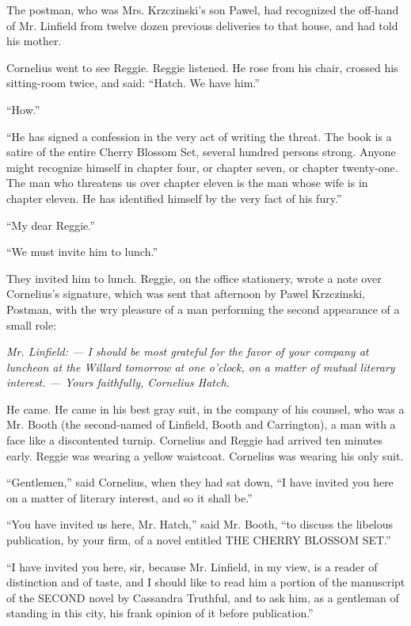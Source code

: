 \documentclass[12pt,openright]{book}
\begin{document}
The postman, who was Mrs. Krzczinski’s son Pawel, had recognized the off-hand of Mr. Linfield from twelve dozen previous deliveries to that house, and had told his mother.

Cornelius went to see Reggie. Reggie listened. He rose from his chair, crossed his sitting-room twice, and said: “Hatch. We have him.”

“How.”

“He has signed a confession in the very act of writing the threat. The book is a satire of the entire Cherry Blossom Set, several hundred persons strong. Anyone might recognize himself in chapter four, or chapter seven, or chapter twenty-one. The man who threatens us over chapter eleven is the man whose wife is in chapter eleven. He has identified himself by the very fact of his fury.”

“My dear Reggie.”

“We must invite him to lunch.”

They invited him to lunch. Reggie, on the office stationery, wrote a note over Cornelius’s signature, which was sent that afternoon by Pawel Krzczinski, Postman, with the wry pleasure of a man performing the second appearance of a small role:

\textit{Mr. Linfield: — I should be most grateful for the favor of your company at luncheon at the Willard tomorrow at one o’clock, on a matter of mutual literary interest. — Yours faithfully, Cornelius Hatch.}

He came. He came in his best gray suit, in the company of his counsel, who was a Mr. Booth (the second-named of Linfield, Booth and Carrington), a man with a face like a discontented turnip. Cornelius and Reggie had arrived ten minutes early. Reggie was wearing a yellow waistcoat. Cornelius was wearing his only suit.

“Gentlemen,” said Cornelius, when they had sat down, “I have invited you here on a matter of literary interest, and so it shall be.”

“You have invited us here, Mr. Hatch,” said Mr. Booth, “to discuss the libelous publication, by your firm, of a novel entitled THE CHERRY BLOSSOM SET.”

“I have invited you here, sir, because Mr. Linfield, in my view, is a reader of distinction and of taste, and I should like to read him a portion of the manuscript of the SECOND novel by Cassandra Truthful, and to ask him, as a gentleman of standing in this city, his frank opinion of it before publication.”
\end{document}
